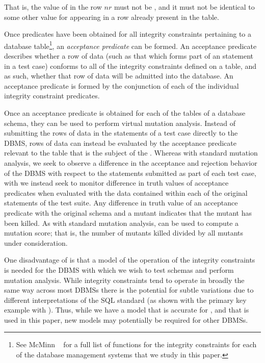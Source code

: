 \vspace{-.5em}
\begin{center}
\end{center}
\vspace{-.5em}

\noindent That is, the value of  in the row $nr$ must not
be \NULL, and it must not be identical to some other value for  appearing in a row already present in the table.



Once predicates have been obtained for all integrity constraints pertaining to a database table\footnote{{\scriptsize See McMinn \etal~\cite{McMinn2015} for a full list of functions for the integrity constraints for each of the database management systems that we study in this paper.}}, an {\it acceptance predicate} can be formed. An acceptance predicate describes whether a row of data (such as that which forms part of an \INSERT statement in a test case) conforms to all of the integrity constraints defined on a table, and as such, whether that row of data will be admitted into the database. An acceptance predicate is formed by the conjunction of each of the individual integrity constraint predicates.


 Once an acceptance predicate is obtained for each of the tables of a database schema, they can be used to perform virtual mutation analysis. Instead of submitting the rows of data in the \INSERT statements of a test case directly to the DBMS, rows of data can instead be evaluated by the acceptance predicate relevant to the table that is the subject of the \INSERT. Whereas with standard mutation analysis, we seek to observe a difference in the acceptance and rejection behavior of the DBMS with respect to the \INSERT statements submitted as part of each test case, with \vma we instead seek to monitor difference in truth values of acceptance predicates when evaluated with the data contained within each of the original \INSERT statements of the test suite. Any difference in truth value of an acceptance predicate with the original schema and a mutant indicates that the mutant has been killed. As with standard mutation analysis, \vma can be used to compute a mutation score; that is, the number of mutants killed divided by all mutants under consideration.

One disadvantage of \VMA is that a model of the operation of the integrity constraints is needed for the DBMS with which we wish to test schemas and perform mutation analysis. While integrity constraints tend to operate in broadly the same way across most DBMSs there is the potential for subtle variations due to different interpretations of the SQL standard (as shown with the primary key example with \SQLite). Thus, while we have a model that is accurate for \HyperSQL, \Postgres and \SQLite that is used in this paper, new models may potentially be required for other DBMSs. 

